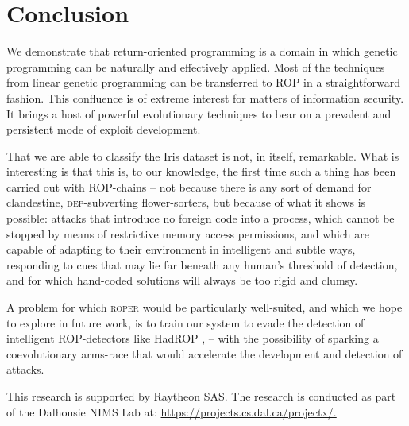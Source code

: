 \section{Conclusion}\label{sec:conclude}

We demonstrate that return-oriented programming is a
domain in which genetic programming can be naturally and
effectively applied. Most of the techniques from
linear genetic programming can be transferred to ROP in
a straightforward fashion. This confluence is of extreme interest
for matters of information security. It brings a host of powerful
evolutionary techniques to bear on a prevalent and persistent
mode of exploit development.%

That we are able to classify the Iris dataset is not, in
itself, remarkable. What is interesting is that this is, to our
knowledge, the first time such a thing has been carried out with
ROP-chains -- not because there is any
sort of demand for clandestine, \textsc{dep}-subverting
flower-sorters, but because of what it shows is possible:
attacks that introduce no foreign code into a process, which
cannot be stopped by means of restrictive memory access
permissions, and which are capable of adapting to their
environment in intelligent and subtle ways, responding to cues
that may lie far beneath any human's threshold of detection, and
for which hand-coded solutions will always be too rigid and
clumsy.%

A problem for which \textsc{roper} would be particularly
well-suited, and which we hope to explore in future work, is to
train our system to evade the detection of intelligent
ROP-detectors like HadROP \cite{pfaff15},  
-- with the possibility of sparking a coevolutionary
arms-race that would accelerate the development and detection of
attacks. 

\begin{acks}
This research is supported by Raytheon SAS\@. The research is conducted as part of the Dalhousie NIMS Lab at: \url{https://projects.cs.dal.ca/projectx/.}
\end{acks}
